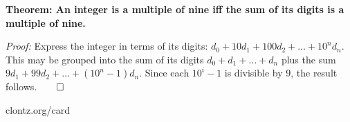 \documentclass[12pt]{article}
\begin{document}
\thispagestyle{empty}


      \textbf{%
        Theorem: An integer is a multiple of nine iff the sum of
        its digits is a multiple of nine.
      }

      \textit{Proof:}
      Express the integer in terms of its digits:
      \(d_0+10d_1+100d_2+\dots+10^nd_n\).
      This may be grouped into the sum of its digits
      \(d_0+d_1+\dots+d_n\) plus the sum
      \(9d_1+99d_2+\dots+(10^n-1)d_n\). Since each
      \(10^i-1\) is divisible by 9, the result
      follows.\(\qed\)

\begin{center}
\scalebox{1.3}{\color{gray}}
\end{center}

\begin{center}
  \color{darkgray} clontz.org/card
\end{center}
\end{document}
